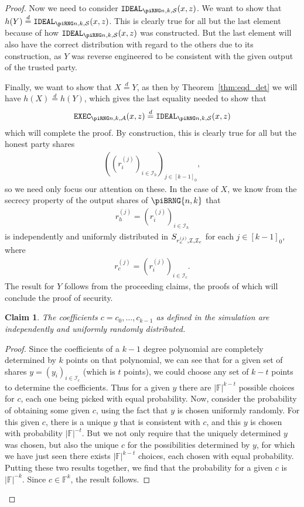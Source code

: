 \documentclass{article}
\newcommand{\eqd}[0]{\stackrel{d}{=}}
\newcommand{\seqZ}[1]{\left[#1\right]_0}
\newtheorem{claim}{Claim}
\theoremstyle{remark}
\newcommand{\F}{\mathbb{F}}
\begin{document}
\begin{proof}
	Now we need to consider $\idealD$. We want to show that $h(Y) \eqd
	\idealD$. This is clearly true for all but the last element because of how
	$\idealD$ was constructed. But the last element will also have the correct
	distribution with regard to the others due to its construction, as $Y$ was
	reverse engineered to be consistent with the given output of the trusted
	party.

	Finally, we want to show that $X \eqd Y$, as then by
	Theorem~\ref{thm:eqd_det} we will have $h(X) \eqd h(Y)$, which gives the
	last equality needed to show that
	\begin{align*}
		\execD \eqd \idealD
	\end{align*}
	which will complete the proof. By construction, this is clearly true for
	all but the honest party shares
	\begin{align*}
		{\left(
			{\left(r_i^{(j)}\right)}_{i \in \mathcal{I}_h}
		\right)}_{j \in \seqZ{k-1}},
	\end{align*}
	so we need only focus our attention on these. In the case of $X$, we know
	from the secrecy property of the output shares of $\piBRNG{n,k}$ that
	\begin{align*}
		r_h^{(j)}
		=
		{\left(r_i^{(j)}\right)}_{i \in \mathcal{I}_h}
	\end{align*}
	is independently and uniformly distributed in
	$S_{r_c^{(j)}, \mathcal{I}, \mathcal{I}_c}$ for each $j \in
	\seqZ{k-1}$, where
	\begin{align*}
		r_c^{(j)} = {\left(r_i^{(j)}\right)}_{i \in \mathcal{I}_c}.
	\end{align*}
	The result for $Y$ follows from the proceeding claims, the proofs of which
	will conclude the proof of security.

	\begin{claim}
		The coefficients $c = c_0, \ldots, c_{k-1}$ as defined in the
		simulation are independently and uniformly randomly distributed.
	\end{claim}

	\begin{proof}
		Since the coefficients of a $k-1$ degree polynomial are completely
		determined by $k$ points on that polynomial, we can see that for a
		given set of shares $y = {(y_i)}_{i \in \mathcal{I}_c}$ (which is $t$
		points), we could choose any set of $k-t$ points to determine the
		coefficients. Thus for a given $y$ there are $|\F|^{k-t}$ possible
		choices for $c$, each one being picked with equal probability. Now,
		consider the probability of obtaining some given $c$, using the fact
		that $y$ is chosen uniformly randomly. For this given $c$, there is a
		unique $y$ that is consistent with $c$, and this $y$ is chosen with
		probability $|\F|^{-t}$. But we not only require that the uniquely
		determined $y$ was chosen, but also the unique $c$ for the
		possibilities determined by $y$, for which we have just seen there
		exists $|\F|^{k-t}$ choices, each chosen with equal probability.
		Putting these two results together, we find that the probability for a
		given $c$ is $|\F|^{-k}$. Since $c \in \F^k$, the result follows.
	\end{proof}


\end{proof}
\end{document}
